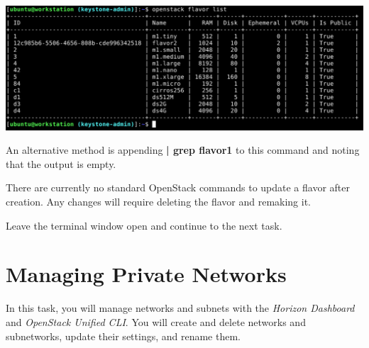 \documentclass[letterpaper, 12pt]{article}
\begin{document}
\begin{enumerate}
\begin{labstep}
        \begin{center}
            \includegraphics[width=\linewidth]{images/part2/step12.png}
        \end{center}
    \end{labstep}

    \begin{tipbox}
        An alternative method is appending \textbf{| grep flavor1} to this command and noting that the output is empty.
    \end{tipbox}

    \begin{notebox}
        There are currently no standard OpenStack commands to update a flavor after creation.
        Any changes will require deleting the flavor and remaking it.
    \end{notebox}

    \begin{labstep}
        Leave the terminal window open and continue to the next task.
    \end{labstep}

\end{enumerate}

\section{Managing Private Networks}\label{sec:managing-private_networks}
In this task, you will manage networks and subnets with the \textit{Horizon Dashboard} and \textit{OpenStack Unified CLI}.
You will create and delete networks and subnetworks, update their settings, and rename them.
\end{document}
